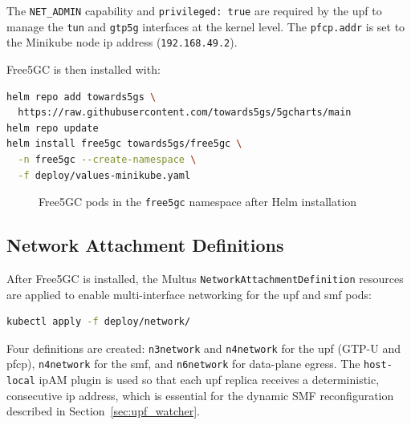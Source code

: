 The \texttt{NET\_ADMIN} capability and \texttt{privileged: true} are required by the \gls{upf} to manage the \texttt{tun} and \texttt{gtp5g} interfaces at the kernel level. The \texttt{pfcp.addr} is set to the Minikube node \gls{ip} address (\texttt{192.168.49.2}).

Free5GC is then installed with:

\begin{lstlisting}[language=bash, caption={Installing Free5GC v3.3.0 via Helm}, label={lst:free5gc_install}]
helm repo add towards5gs \
  https://raw.githubusercontent.com/towards5gs/5gcharts/main
helm repo update
helm install free5gc towards5gs/free5gc \
  -n free5gc --create-namespace \
  -f deploy/values-minikube.yaml
\end{lstlisting}

\begin{figure}[H]
  \centering
  \caption{Free5GC pods in the \texttt{free5gc} namespace after Helm installation}
  \label{fig:free5gc_pods}
\end{figure}

\subsection{Network Attachment Definitions}

After Free5GC is installed, the Multus \texttt{NetworkAttachmentDefinition} resources are applied to enable multi-interface networking for the \gls{upf} and \gls{smf} pods:

\begin{lstlisting}[language=bash, caption={Applying Multus network configurations}, label={lst:apply_nad}]
kubectl apply -f deploy/network/
\end{lstlisting}

Four definitions are created: \texttt{n3network} and \texttt{n4network} for the \gls{upf} (GTP-U and \gls{pfcp}), \texttt{n4network} for the \gls{smf}, and \texttt{n6network} for data-plane egress. The \texttt{host-local} \gls{ip}AM plugin is used so that each \gls{upf} replica receives a deterministic, consecutive \gls{ip} address, which is essential for the dynamic SMF reconfiguration described in Section~\ref{sec:upf_watcher}.

